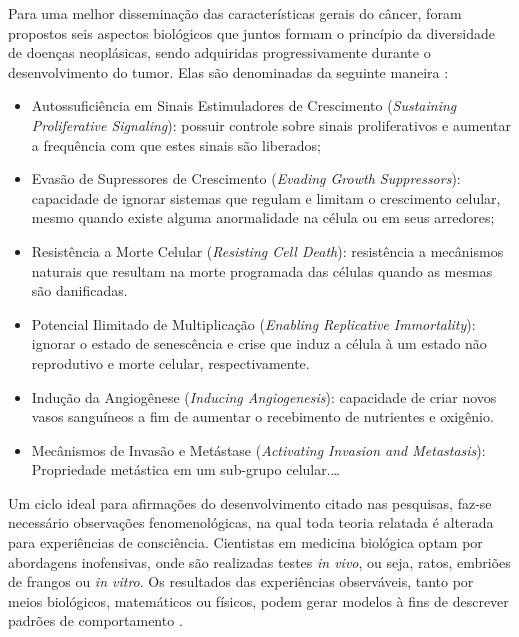 \documentclass[12pt]{article}
\begin{document}
Para uma melhor disseminação das características gerais do câncer, foram propostos seis aspectos biológicos que juntos formam o princípio da diversidade de doenças neoplásicas, sendo adquiridas progressivamente durante o desenvolvimento do tumor. Elas são denominadas da seguinte maneira \cite{Hanahan2011}:

\begin{itemize}
  \item Autossuficiência em Sinais Estimuladores de Crescimento (\textit{Sustaining Proliferative Signaling}): possuir controle sobre sinais proliferativos e aumentar a frequência com que estes sinais são liberados;
  \item Evasão de Supressores de Crescimento (\textit{Evading Growth Suppressors}): capacidade de ignorar sistemas que regulam e limitam o crescimento celular, mesmo quando existe alguma anormalidade na célula ou em seus arredores;
  \item Resistência a Morte Celular (\textit{Resisting Cell Death}): resistência a mecânismos naturais que resultam na morte programada das células quando as mesmas são danificadas.
  \item Potencial Ilimitado de Multiplicação (\textit{Enabling Replicative Immortality}): ignorar o estado de senescência e crise que induz a célula à um estado não reprodutivo e morte celular, respectivamente.
  \item Indução da Angiogênese (\textit{Inducing Angiogenesis}): capacidade de criar novos vasos sanguíneos a fim de aumentar o recebimento de nutrientes e oxigênio.
  \item Mecânismos de Invasão e Metástase (\textit{Activating Invasion and Metastasis}): Propriedade metástica em um sub-grupo celular.\ldots
\end{itemize}


Um ciclo ideal para afirmações do desenvolvimento citado nas pesquisas, faz-se necessário observações fenomenológicas, na qual toda teoria relatada é alterada para experiências de consciência. Cientistas em medicina biológica optam por abordagens inofensivas, onde são realizadas testes \textit{in vivo}, ou seja, ratos, embriões de frangos ou \textit{in vitro}. Os resultados das experiências observáveis, tanto por meios biológicos, matemáticos ou físicos, podem gerar modelos à fins de descrever padrões de comportamento \cite{Preziosi2003}.
\end{document}
